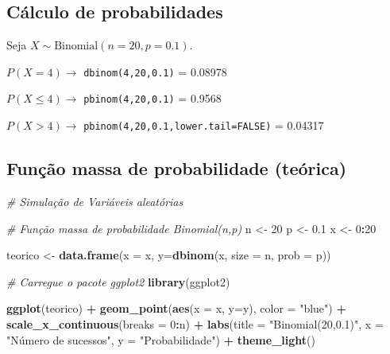 \documentclass[
]{book}
\newenvironment{Shaded}{\begin{snugshade}}{\end{snugshade}}
\newcommand{\AttributeTok}[1]{\textcolor[rgb]{0.13,0.29,0.53}{#1}}
\newcommand{\CommentTok}[1]{\textcolor[rgb]{0.56,0.35,0.01}{\textit{#1}}}
\newcommand{\DecValTok}[1]{\textcolor[rgb]{0.00,0.00,0.81}{#1}}
\newcommand{\FloatTok}[1]{\textcolor[rgb]{0.00,0.00,0.81}{#1}}
\newcommand{\FunctionTok}[1]{\textcolor[rgb]{0.13,0.29,0.53}{\textbf{#1}}}
\newcommand{\NormalTok}[1]{#1}
\newcommand{\OtherTok}[1]{\textcolor[rgb]{0.56,0.35,0.01}{#1}}
\newcommand{\SpecialCharTok}[1]{\textcolor[rgb]{0.81,0.36,0.00}{\textbf{#1}}}
\newcommand{\StringTok}[1]{\textcolor[rgb]{0.31,0.60,0.02}{#1}}
\begin{document}
\subsection{Cálculo de probabilidades}\label{cuxe1lculo-de-probabilidades}

Seja \(X\sim \text{Binomial}(n=20,p=0.1)\).

\(P(X = 4) \to\) \texttt{dbinom(4,20,0.1)} = 0.08978

\(P(X \leq 4) \to\) \texttt{pbinom(4,20,0.1)} = 0.9568

\(P(X > 4)\to\) \texttt{pbinom(4,20,0.1,lower.tail=FALSE)} = 0.04317

\subsection{Função massa de probabilidade (teórica)}\label{funuxe7uxe3o-massa-de-probabilidade-teuxf3rica}

\begin{Shaded}
\begin{Highlighting}[]
\CommentTok{\# Simulação de Variáveis aleatórias}

\CommentTok{\# Função massa de probabilidade Binomial(n,p)}
\NormalTok{n }\OtherTok{\textless{}{-}} \DecValTok{20}
\NormalTok{p }\OtherTok{\textless{}{-}} \FloatTok{0.1}
\NormalTok{x }\OtherTok{\textless{}{-}} \DecValTok{0}\SpecialCharTok{:}\DecValTok{20}

\NormalTok{teorico }\OtherTok{\textless{}{-}} \FunctionTok{data.frame}\NormalTok{(}\AttributeTok{x =}\NormalTok{ x, }\AttributeTok{y=}\FunctionTok{dbinom}\NormalTok{(x, }\AttributeTok{size =}\NormalTok{ n, }\AttributeTok{prob =}\NormalTok{ p))}

\CommentTok{\# Carregue o pacote ggplot2}
\FunctionTok{library}\NormalTok{(ggplot2)}

\FunctionTok{ggplot}\NormalTok{(teorico) }\SpecialCharTok{+}  
  \FunctionTok{geom\_point}\NormalTok{(}\FunctionTok{aes}\NormalTok{(}\AttributeTok{x =}\NormalTok{ x, }\AttributeTok{y=}\NormalTok{y), }\AttributeTok{color =} \StringTok{"blue"}\NormalTok{) }\SpecialCharTok{+} 
  \FunctionTok{scale\_x\_continuous}\NormalTok{(}\AttributeTok{breaks =} \DecValTok{0}\SpecialCharTok{:}\NormalTok{n) }\SpecialCharTok{+}  
  \FunctionTok{labs}\NormalTok{(}\AttributeTok{title =} \StringTok{"Binomial(20,0.1)"}\NormalTok{, }\AttributeTok{x =} \StringTok{"Número de sucessos"}\NormalTok{, }\AttributeTok{y =} \StringTok{"Probabilidade"}\NormalTok{) }\SpecialCharTok{+}  
  \FunctionTok{theme\_light}\NormalTok{()}
\end{Highlighting}
\end{Shaded}
\end{document}
